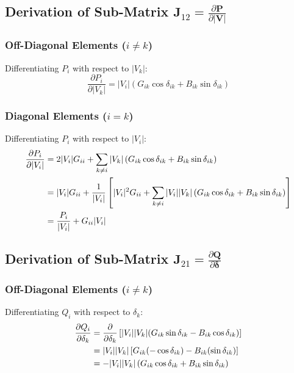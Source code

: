 \documentclass[12pt,a4paper,oneside]{report}
\begin{document}
\subsection{Derivation of Sub-Matrix $\mathbf{J}_{12} = \frac{\partial \mathbf{P}}{\partial |\mathbf{V}|}$}

\subsubsection{Off-Diagonal Elements ($i \neq k$)}
Differentiating $P_i$ with respect to $|V_k|$:
\begin{equation}
\frac{\partial P_i}{\partial |V_k|} = |V_i| \left( G_{ik} \cos\delta_{ik} + B_{ik} \sin\delta_{ik} \right)
\label{eq:j12_off}
\end{equation}

\subsubsection{Diagonal Elements ($i = k$)}
Differentiating $P_i$ with respect to $|V_i|$:
\begin{align}
\frac{\partial P_i}{\partial |V_i|} &= 2 |V_i| G_{ii} + \sum_{k \neq i} |V_k| \left( G_{ik} \cos\delta_{ik} + B_{ik} \sin\delta_{ik} \right) \notag \\
&= |V_i| G_{ii} + \frac{1}{|V_i|} \left[ |V_i|^2 G_{ii} + \sum_{k \neq i} |V_i| |V_k| \left( G_{ik} \cos\delta_{ik} + B_{ik} \sin\delta_{ik} \right) \right] \notag \\
&= \frac{P_i}{|V_i|} + G_{ii} |V_i|
\label{eq:j12_diag}
\end{align}

\subsection{Derivation of Sub-Matrix $\mathbf{J}_{21} = \frac{\partial \mathbf{Q}}{\partial \boldsymbol{\delta}}$}

\subsubsection{Off-Diagonal Elements ($i \neq k$)}
Differentiating $Q_i$ with respect to $\delta_k$:
\begin{align}
\frac{\partial Q_i}{\partial \delta_k} &= \frac{\partial}{\partial \delta_k} \left[ |V_i| |V_k| (G_{ik} \sin\delta_{ik} - B_{ik} \cos\delta_{ik}) \right] \notag \\
&= |V_i| |V_k| \left[ G_{ik} (-\cos\delta_{ik}) - B_{ik} (\sin\delta_{ik}) \right] \notag \\
&= -|V_i| |V_k| \left( G_{ik} \cos\delta_{ik} + B_{ik} \sin\delta_{ik} \right)
\label{eq:j21_off}
\end{align}
\end{document}
